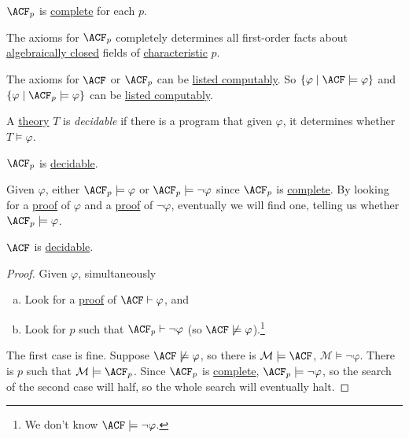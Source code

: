 \begin{corollary}
	\(\ACF_p\) is \hyperref[def:theory-complete]{complete} for each \(p\).
\end{corollary}

The axioms for \(\ACF_p \) completely determines all first-order facts about \hyperref[def:algebraically-closed]{algebraically closed} fields of \hyperref[def:characteristic]{characteristic} \(p\).

\begin{remark}[Fact]
	The axioms for \(\ACF \) or \(\ACF_p \) can be \hyperref[def:computably-enumerable]{listed computably}. So \(\left\{ \varphi \mid \ACF \models \varphi \right\} \) and \(\left\{ \varphi \mid \ACF_p \models \varphi \right\} \) can be \hyperref[def:computably-enumerable]{listed computably}.
\end{remark}

\begin{definition}[Decidable]\label{def:decidable}
	A \hyperref[def:theory]{theory} \(T\) is \emph{decidable} if there is a program that given \(\varphi \), it determines whether \(T \models \varphi \).
\end{definition}

\begin{remark}
	\(\ACF_p \) is \hyperref[def:decidable]{decidable}.
\end{remark}
\begin{explanation}
	Given \(\varphi \), either \(\ACF_p \models \varphi \) or \(\ACF_p \models \lnot \varphi \) since \(\ACF_p \) is \hyperref[def:theory-complete]{complete}. By looking for a \hyperref[def:proof]{proof} of \(\varphi \) and a \hyperref[def:proof]{proof} of \(\lnot \varphi \), eventually we will find one, telling us whether \(\ACF_p \models \varphi \).
\end{explanation}

\begin{theorem}
	\(\ACF \) is \hyperref[def:decidable]{decidable}.
\end{theorem}
\begin{proof}
	Given \(\varphi \), simultaneously
	\begin{enumerate}[(a)]
		\item Look for a \hyperref[def:proof]{proof} of \(\ACF \vdash \varphi \), and
		\item Look for \(p\) such that \(\ACF_p \vdash \lnot \varphi \) (so \(\ACF \not \models \varphi \)).\footnote{We don't know \(\ACF \models \lnot \varphi \).}
	\end{enumerate}
	The first case is fine. Suppose \(\ACF \not \models \varphi \), so there is \(\mathcal{M} \models \ACF\), \(\mathrm{\mathcal{M} \models \lnot \varphi } \). There is \(p\) such that \(\mathcal{M} \models \ACF_p\). Since \(\ACF_p\) is \hyperref[def:theory-complete]{complete}, \(\ACF_p \models \lnot \varphi \), so the search of the second case will half, so the whole search will eventually halt.
\end{proof}